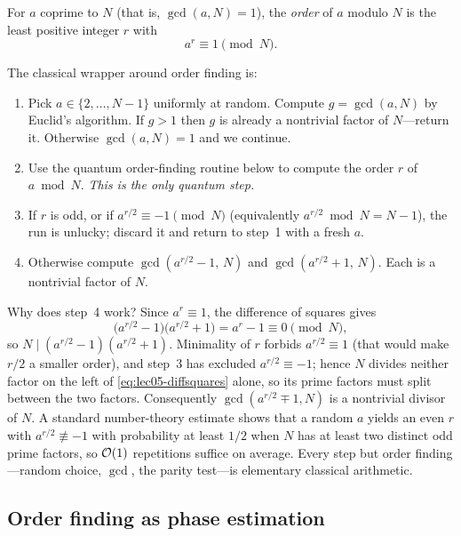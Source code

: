 \begin{definition}
\label{def:lec05-order}
For $a$ coprime to $N$ (that is, $\gcd(a,N)=1$), the \emph{order} of $a$ modulo
$N$ is the least positive integer $r$ with
\[
  a^{r}\equiv 1 \pmod N .
\]
\end{definition}

The classical wrapper around order finding is:
\begin{enumerate}[leftmargin=1.6em,nosep]
  \item Pick $a\in\{2,\dots,N-1\}$ uniformly at random. Compute $g=\gcd(a,N)$ by
        Euclid's algorithm. If $g>1$ then $g$ is already a nontrivial factor of
        $N$---return it. Otherwise $\gcd(a,N)=1$ and we continue.
  \item Use the quantum order-finding routine below to compute the order $r$ of
        $a\bmod N$. \emph{This is the only quantum step.}
  \item If $r$ is odd, or if $a^{r/2}\equiv -1\pmod N$ (equivalently
        $a^{r/2}\bmod N=N-1$), the run is unlucky; discard it and return to
        step~1 with a fresh $a$.
  \item Otherwise compute $\gcd(a^{r/2}-1,\,N)$ and $\gcd(a^{r/2}+1,\,N)$. Each is
        a nontrivial factor of $N$.
\end{enumerate}

Why does step~4 work? Since $a^{r}\equiv1$, the difference of squares gives
\begin{equation}
  \bigl(a^{r/2}-1\bigr)\bigl(a^{r/2}+1\bigr)=a^{r}-1\equiv 0 \pmod N,
  \label{eq:lec05-diffsquares}
\end{equation}
so $N\mid(a^{r/2}-1)(a^{r/2}+1)$. Minimality of $r$ forbids
$a^{r/2}\equiv 1$ (that would make $r/2$ a smaller order), and step~3 has excluded
$a^{r/2}\equiv -1$; hence $N$ divides neither factor on the left of
\eqref{eq:lec05-diffsquares} alone, so its prime factors must split between the
two factors. Consequently $\gcd(a^{r/2}\mp1,N)$ is a nontrivial divisor of $N$. A
standard number-theory estimate shows that a random $a$ yields an even $r$ with
$a^{r/2}\not\equiv-1$ with probability at least $1/2$ when $N$ has at least two
distinct odd prime factors, so $\mathcal{O}(1)$ repetitions suffice on average. Every
step but order finding---random choice, $\gcd$, the parity test---is elementary
classical arithmetic.

\subsection*{Order finding as phase estimation}

